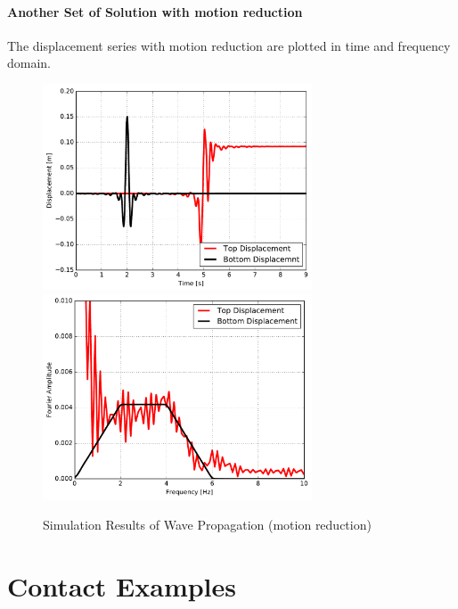\paragraph{Another Set of Solution with motion reduction}

The displacement series with motion reduction are plotted in time and frequency domain.

\begin{figure}[H]
  \centering
  \includegraphics[width = 8cm]{./Figure-files/Day3/Wave_Propagation_through_elastoplastic_Soil/2Displacement.pdf}
  \includegraphics[width = 8cm]{./Figure-files/Day3/Wave_Propagation_through_elastoplastic_Soil/2Displacement_Spectrum.pdf}
  \caption{Simulation Results of Wave Propagation (motion reduction)}
  \label{fig_elastic_plastic_wave_propagation_Half}
\end{figure}






\clearpage
\newpage
\section{Contact Examples}
\label{Contact_Examples}
